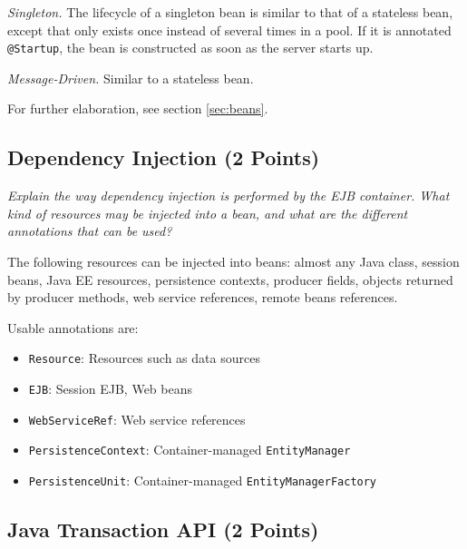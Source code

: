 \documentclass[a4paper,10pt]{article}
\begin{document}
\vspace{3mm}

\emph{Singleton.} The lifecycle of a singleton bean is similar to that of a stateless bean, except
that only exists once instead of several times in a pool. If it is annotated \lstinline|@Startup|,
the bean is constructed as soon as the server starts up.

\vspace{3mm}

\emph{Message-Driven.} Similar to a stateless bean.

\vspace{3mm}

For further elaboration, see section \ref{sec:beans}.

\subsection{Dependency Injection (2 Points)}

\emph{
Explain the way dependency injection is performed by the EJB container. What kind of resources may
be injected into a bean, and what are the different annotations that can be used?}

\vspace{3mm}


The following resources can be injected into beans: almost any Java class, session beans, 
Java EE resources, persistence contexts, producer fields, objects returned by producer methods,
web service references, remote beans references.

Usable annotations are:

\begin{itemize}
    \item \lstinline|Resource|: Resources such as data sources
    \item \lstinline|EJB|: Session EJB, Web beans
    \item \lstinline|WebServiceRef|: Web service references
    \item \lstinline|PersistenceContext|: Container-managed \lstinline|EntityManager|
    \item \lstinline|PersistenceUnit|: Container-managed \lstinline|EntityManagerFactory|
\end{itemize}

\subsection{Java Transaction API (2 Points)}
\end{document}
